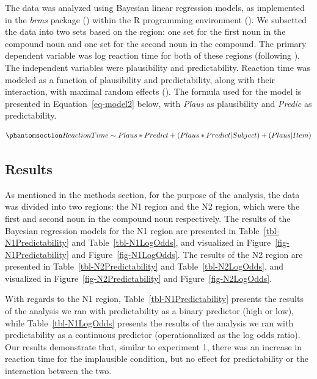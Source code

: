 \documentclass[
  12pt,
  letterpaper,
]{scrreprt}
\begin{document}
The data was analyzed using Bayesian linear regression models, as
implemented in the \emph{brms} package
() within
the R programming environment (). We subsetted the data into two sets based on the region: one set
for the first noun in the compound noun and one set for the second noun
in the compound. The primary dependent variable was log reaction time
for both of these regions (following
). The
independent variables were plausibility and predictability. Reaction
time was modeled as a function of plausibility and predictability, along
with their interaction, with maximal random effects
(). The
formula used for the model is presented in Equation~\ref{eq-model2}
below, with \emph{Plaus} as plausibility and \emph{Predic} as
predictability.

\begin{equation}\phantomsection\label{eq-model2}{
Reaction Time\sim Plaus*Predict+(Plaus*Predict|Subject)+(Plaus|Item) 
}\end{equation}

\subsection{Results}\label{results-1}

As mentioned in the methods section, for the purpose of the analysis,
the data was divided into two regions: the N1 region and the N2 region,
which were the first and second noun in the compound noun respectively.
The results of the Bayesian regression models for the N1 region are
presented in Table~\ref{tbl-N1Predictability} and
Table~\ref{tbl-N1LogOdds}, and visualized in
Figure~\ref{fig-N1Predictability} and Figure~\ref{fig-N1LogOdds}. The
results of the N2 region are presented in
Table~\ref{tbl-N2Predictability} and Table~\ref{tbl-N2LogOdds}, and
visualized in Figure~\ref{fig-N2Predictability} and
Figure~\ref{fig-N2LogOdds}.

With regards to the N1 region, Table~\ref{tbl-N1Predictability} presents
the results of the analysis we ran with predictability as a binary
predictor (high or low), while Table~\ref{tbl-N1LogOdds} presents the
results of the analysis we ran with predictability as a continuous
predictor (operationalized as the log odds ratio). Our results
demonstrate that, similar to experiment 1, there was an increase in
reaction time for the implausible condition, but no effect for
predictability or the interaction between the two.
\end{document}

